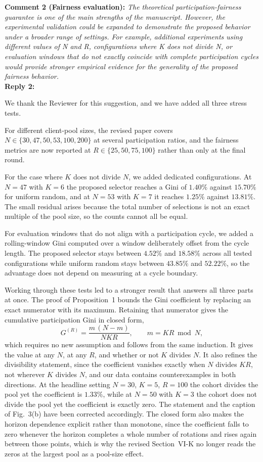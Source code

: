 \documentclass[10pt]{article}
\begin{document}
\noindent
\textbf{Comment 2 (Fairness evaluation):} \textit{The theoretical participation-fairness guarantee is one of the main strengths of the manuscript. However, the experimental validation could be expanded to demonstrate the proposed behavior under a broader range of settings. For example, additional experiments using different values of N and R, configurations where K does not divide N, or evaluation windows that do not exactly coincide with complete participation cycles would provide stronger empirical evidence for the generality of the proposed fairness behavior.} \\
\noindent
\textbf{Reply 2:} {We thank the Reviewer for this suggestion, and we have added all three stress tests.

For different client-pool sizes, the revised paper covers $N \in \{30, 47, 50, 53, 100, 200\}$ at several participation ratios, and the fairness metrics are now reported at $R \in \{25, 50, 75, 100\}$ rather than only at the final round.

For the case where $K$ does not divide $N$, we added dedicated configurations. At $N = 47$ with $K = 6$ the proposed selector reaches a Gini of $1.40\%$ against $15.70\%$ for uniform random, and at $N = 53$ with $K = 7$ it reaches $1.25\%$ against $13.81\%$. The small residual arises because the total number of selections is not an exact multiple of the pool size, so the counts cannot all be equal.

For evaluation windows that do not align with a participation cycle, we added a rolling-window Gini computed over a window deliberately offset from the cycle length. The proposed selector stays between $4.52\%$ and $18.58\%$ across all tested configurations while uniform random stays between $43.85\%$ and $52.22\%$, so the advantage does not depend on measuring at a cycle boundary.

Working through these tests led to a stronger result that answers all three parts at once. The proof of Proposition~1 bounds the Gini coefficient by replacing an exact numerator with its maximum. Retaining that numerator gives the cumulative participation Gini in closed form,
\[
G^{(R)} = \frac{m\,(N-m)}{N K R}, \qquad m = KR \bmod N ,
\]
which requires no new assumption and follows from the same induction. It gives the value at any $N$, at any $R$, and whether or not $K$ divides $N$. It also refines the divisibility statement, since the coefficient vanishes exactly when $N$ divides $KR$, not wherever $K$ divides $N$, and our data contains counterexamples in both directions. At the headline setting $N=30$, $K=5$, $R=100$ the cohort divides the pool yet the coefficient is $1.33\%$, while at $N=50$ with $K=3$ the cohort does not divide the pool yet the coefficient is exactly zero. The statement and the caption of Fig.~3(b) have been corrected accordingly. The closed form also makes the horizon dependence explicit rather than monotone, since the coefficient falls to zero whenever the horizon completes a whole number of rotations and rises again between those points, which is why the revised Section~VI-K no longer reads the zeros at the largest pool as a pool-size effect.

}
\end{document}
